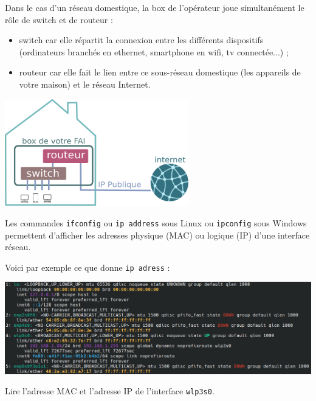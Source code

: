 \documentclass[a4paper,dvipsnames]{article}
\begin{document}
\medskip

\begin{remarque}[breakable, title=Cas d'un réseau domestique]{}{}
  Dans le cas d'un réseau domestique, la box de l'opérateur joue simultanément le rôle de switch et de routeur :
  \begin{itemize}
    \item switch car elle répartit la connexion entre les différents dispositifs (ordinateurs branchés en ethernet, smartphone en wifi, tv connectée...) ;
    \item routeur car elle fait le lien entre ce sous-réseau domestique (les appareils de votre maison) et le réseau Internet.
  \end{itemize}
    
  \begin{center}
    \includegraphics[width=8cm]{img/boxmaison.png}
  \end{center}
\end{remarque}

\medskip

\begin{definition}[breakable, title=Les commandes ipconfig (Windows) et ip (Linux)]{}{}
  Les commandes \texttt{ifconfig} ou \texttt{ip address} sous Linux ou \texttt{ipconfig} sous Windows permettent d'afficher les adresses physique (MAC) ou logique (IP) d'une interface réseau. 
\end{definition}

\medskip

\begin{exercice}[breakable]{}{}
  Voici par exemple ce que donne \texttt{ip adress} :

  \begin{center}
    \includegraphics[width=14cm]{img/ip_address.png}
  \end{center}

  Lire l'adresse MAC et l'adresse IP de l'interface \texttt{wlp3s0}.
\end{exercice}
\end{document}
